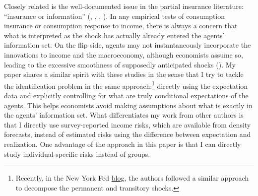 Closely related is the well-documented issue in the partial insurance literature: ``insurance or information''
(\cite{pistaferri_superior_2001},
\cite{kaufmann_disentangling_2009}, \cite{meghir2011earnings}, \cite{kaplan2010much}). In any
empirical tests of consumption insurance or consumption response to
income, there is always a concern that what is interpreted as the shock
has actually already entered the agents' information set. On the flip side, agents may not instantaneously incorporate the innovations to income and the macroeconomy, although economists assume so, leading to the excessive smoothness of supposedly anticipated shocks (\cite{flavin_excess_1988}). My paper shares a similar spirit with these studies in the sense that I try to tackle the identification problem in the same approach:\footnote{Recently, in the New York Fed \href{https://libertystreeteconomics.newyorkfed.org/2017/11/understanding-permanent-and-temporary-income-shocks.html}{blog}, the authors followed a similar approach to decompose the permanent and transitory shocks.} directly using the expectation data and explicitly controlling for what are truly conditional expectations of the agents. This helps economists avoid making assumptions about what is exactly in the agents' information set. What differentiates my work from other authors is that I directly use survey-reported income risks, which are available from density forecasts, instead of estimated risks using the difference between expectation and realization. One advantage of the approach in this paper is that I can directly study individual-specific risks instead of groups.

